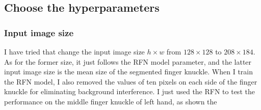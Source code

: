 \subsection{Choose the hyperparameters}
\subsubsection{Input image size}
I have tried that change the input image size $h\times w$ from $128\times128$ to $208\times184$. As for the former size, it just follows the RFN model parameter, and the latter input image size is the mean size of the segmented finger knuckle. When I train the RFN model, I also removed the values of ten pixels on each side of the finger knuckle for eliminating background interference. I just used the RFN to test the performance on the middle finger knuckle of left hand, as shown the 